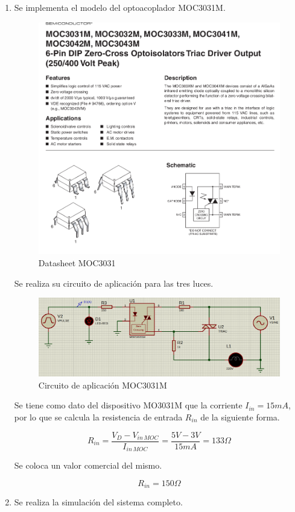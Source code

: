 \documentclass{article}
\begin{document}
\begin{enumerate}[label=\alph*.]
    \item Se implementa el modelo del optoacoplador MOC3031M.

\begin{figure}[h!]
    \centering
    \includegraphics[width=0.6\linewidth]{img/MOC3031.png}
    \caption{Datasheet MOC3031}
    \label{fig:esquematico}
\end{figure}

\newpage

Se realiza su circuito de aplicación para las tres luces.

\begin{figure}[h!]
    \centering
    \includegraphics[width=0.6\linewidth]{img/Circuito de aplicación.png}
    \caption{Circuito de aplicación MOC3031M}
    \label{fig:esquematico}
\end{figure}

Se tiene como dato del dispositivo MO3031M que la corriente $I_{in}= 15mA$, por lo que se calcula la resistencia de entrada $R_{in}$ de la siguiente forma.

$$ R_{in}= \frac{V_{D}-V_{in \, MOC}}{I_{in \, MOC}}= \frac{5V-3V}{15mA}= 133 \Omega $$

Se coloca un valor comercial del mismo.

$$ \boxed{ R_{in}= 150 \Omega } $$

    \item Se realiza la simulación del sistema completo.


\end{enumerate}
\end{document}
